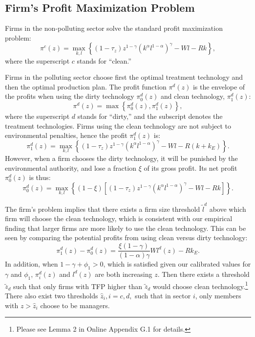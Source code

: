\documentclass[AEJ]{AEA}
\begin{document}
\subsection{Firm's Profit Maximization Problem}

Firms in the non-polluting sector solve the standard profit maximization problem:
\begin{equation*}
    \pi^c(z) = \max_{k,l} \left\{ (1-\tau_z) z^{1-\gamma}(k^{\alpha}l^{1-\alpha})^{\gamma} - Wl - Rk \right\},
\end{equation*}
where the superscript $c$ stands for ``clean.''

Firms in the polluting sector choose first the optimal treatment technology and then the optimal production plan. The profit function $\pi^d(z)$ is the envelope of the profits when using the dirty technology $\pi_0^d(z)$ and clean technology, $\pi_1^d(z)$:
\begin{equation*}
    \pi^d(z) = \max \left\{ \pi_0^d(z), \pi_1^d(z) \right\},
\end{equation*}
where the superscript $d$ stands for ``dirty,'' and the subscript denotes the treatment technologies. Firms using the clean technology are not subject to environmental penalties, hence the profit $\pi_1^d(z)$ is:
\begin{equation*}
    \pi_1^d(z) = \max_{k,l} \left\{ (1-\tau_z) z^{1-\gamma} (k^{\alpha} l^{1-\alpha})^{\gamma} - Wl - R (k+k_E) \right\}.
\end{equation*}
However, when a firm chooses the dirty technology, it will be punished by the environmental authority, and lose a fraction $\xi$ of its gross profit. Its net profit $\pi_0^d(z)$ is thus:
\begin{equation*}
    \pi_0^d(z) = \max_{k,l} \left\{ \left( 1 - \xi \right)
        \left[ (1-\tau_z) z^{1-\gamma} (k^{\alpha} l^{1-\alpha})^{\gamma} - Wl - Rk \right] \right\}.
\end{equation*}

The firm's problem implies that there exists a firm size threshold $\tilde{l}^d$ above which firm will choose the clean technology, which is consistent with our empirical finding that larger firms are more likely to use the clean technology. This can be seen by comparing the potential profits from using clean versus dirty technology:
\begin{equation*}
    \pi_1^d(z) - \pi_0^d(z)  = \frac{\xi(1-\gamma)}{(1-\alpha)\gamma}Wl^d(z) - Rk_E.
\end{equation*}
In addition, when $1-\gamma+\phi_1 > 0$, which is satisfied given our calibrated values for $\gamma$ and $\phi_1$, $\pi_i^d(z)$ and $l^d(z)$ are both increasing $z$. Then there exists a threshold $\tilde{z}_d$ such that only firms with TFP higher than $\tilde{z}_d$ would choose clean technology.\footnote{Please see Lemma 2 in Online Appendix G.1 for details.} There also exist two thresholds $\hat{z}_i, i=c,d,$ such that in sector $i$, only members with $z > \hat{z}_i$ choose to be managers.
\end{document}
